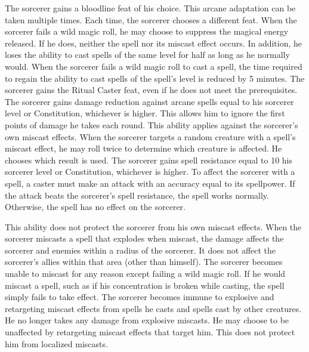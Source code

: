 The sorcerer gains a bloodline feat of his choice.
This arcane adaptation can be taken multiple times.
Each time, the sorcerer chooses a different feat.
When the sorcerer fails a wild magic roll, he may choose to suppress the magical energy released.
If he does, neither the spell nor its miscast effect occurs.
In addition, he loses the ability to cast spells of the same level for half as long as he normally would.
When the sorcerer fails a wild magic roll to cast a spell, the time required to regain the ability to cast spells of the spell's level is reduced by 5 minutes.
The sorcerer gains the Ritual Caster feat, even if he does not meet the prerequisites.
The sorcerer gains damage reduction against arcane spells equal to his sorcerer level or Constitution, whichever is higher.
This allows him to ignore the first points of damage he takes each round.
This ability applies against the sorcerer's own miscast effects.
When the sorcerer targets a random creature with a spell's miscast effect, he may roll twice to determine which creature is affected.
He chooses which result is used.
The sorcerer gains spell resistance equal to 10 \add his sorcerer level or Constitution, whichever is higher.
To affect the sorcerer with a spell, a caster must make an attack with an accuracy equal to its spellpower.
If the attack beats the sorcerer's spell resistance, the spell works normally.
Otherwise, the spell has no effect on the sorcerer.

This ability does not protect the sorcerer from his own miscast effects.
When the sorcerer miscasts a spell that explodes when miscast, the damage affects the sorcerer and enemies within a \areasmall radius of the sorcerer.
It does not affect the sorcerer's allies within that area (other than himself).
The sorcerer becomes unable to miscast for any reason except failing a wild magic roll.
If he would miscast a spell, such as if his concentration is broken while casting, the spell simply fails to take effect.
The sorcerer becomes immune to explosive and retargeting miscast effects from spells he casts and spells cast by other creatures.
He no longer takes any damage from explosive miscasts.
He may choose to be unaffected by retargeting miscast effects that target him.
This does not protect him from localized miscasts.

